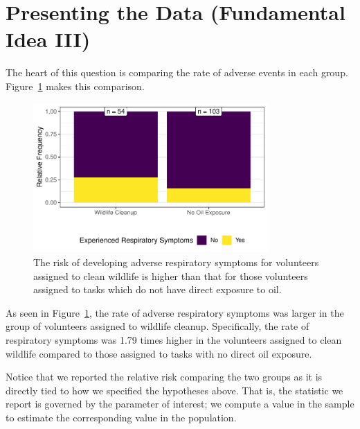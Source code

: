\documentclass[
  letterpaper,
  DIV=11,
  numbers=noendperiod]{scrreprt}
\theoremstyle{plain}
\theoremstyle{definition}
\theoremstyle{definition}
\theoremstyle{remark}
\begin{document}
\hypertarget{presenting-the-data-fundamental-idea-iii}{%
\section{Presenting the Data (Fundamental Idea
III)}\label{presenting-the-data-fundamental-idea-iii}}

The heart of this question is comparing the rate of adverse events in
each group. Figure~\ref{fig-recaplanguage-deepwater-plot} makes this
comparison.

\begin{figure}

{\centering \includegraphics[width=0.8\textwidth,height=\textheight]{./images/fig-recaplanguage-deepwater-plot-1.pdf}

}

\caption{\label{fig-recaplanguage-deepwater-plot}The risk of developing
adverse respiratory symptoms for volunteers assigned to clean wildlife
is higher than that for those volunteers assigned to tasks which do not
have direct exposure to oil.}

\end{figure}

As seen in Figure~\ref{fig-recaplanguage-deepwater-plot}, the rate of
adverse respiratory symptoms was larger in the group of volunteers
assigned to wildlife cleanup. Specifically, the rate of respiratory
symptoms was 1.79 times higher in the volunteers assigned to clean
wildlife compared to those assigned to tasks with no direct oil
exposure.

Notice that we reported the relative risk comparing the two groups as it
is directly tied to how we specified the hypotheses above. That is, the
statistic we report is governed by the parameter of interest; we compute
a value in the sample to estimate the corresponding value in the
population.
\end{document}

